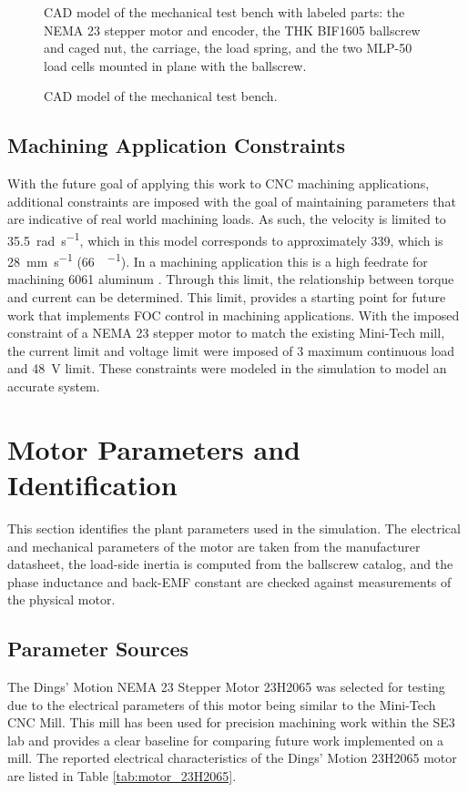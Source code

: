 \begin{figure}[htbp]
	\centering
		{CAD model of the mechanical test bench with labeled parts: the NEMA 23 stepper motor and encoder, the THK BIF1605 ballscrew and caged nut, the carriage, the load spring, and the two MLP-50 load cells mounted in plane with the ballscrew.}
	\caption[Mechanical test bench]{CAD model of the mechanical test bench.}
	\label{fig:testbench_cad}
\end{figure}


\subsection{Machining Application Constraints}\label{machineApplicationConstraints}
With the future goal of applying this work to CNC machining applications, additional constraints are imposed with the goal of maintaining parameters that are indicative of real world machining loads. As such, the velocity is limited to \SI{35.5}{\radian\per\second}, which in this model corresponds to approximately \SI{339}{\rpm}, which is \SI{28}{\milli\meter\per\second} (\SI{66}{\inch\per\min}). In a machining application this is a high feedrate for machining 6061 aluminum \cite{oberg_machinerys_2020}. Through this limit, the relationship between torque and current can be determined. This limit, provides a starting point for future work that implements FOC control in machining applications. With the imposed constraint of a NEMA 23 stepper motor to match the existing Mini-Tech mill, the current limit and voltage limit were imposed of \SI{3}{\ampererms} maximum continuous load and \SI{48}{\volt} limit. These constraints were modeled in the simulation to model an accurate system.

\section{Motor Parameters and Identification}\label{motorParametersAndIdentification}

This section identifies the plant parameters used in the simulation. The electrical and mechanical parameters of the motor are taken from the manufacturer datasheet, the load-side inertia is computed from the ballscrew catalog, and the phase inductance and back-EMF constant are checked against measurements of the physical motor.

\subsection{Parameter Sources}\label{parameterSources}
The Dings' Motion NEMA 23 Stepper Motor 23H2065 was selected for testing due to the electrical parameters of this motor being similar to the Mini-Tech CNC Mill. This mill has been used for precision machining work within the SE3 lab and provides a clear baseline for comparing future work implemented on a mill. The reported electrical characteristics of the Dings' Motion 23H2065 motor are listed in Table \ref{tab:motor_23H2065}.



